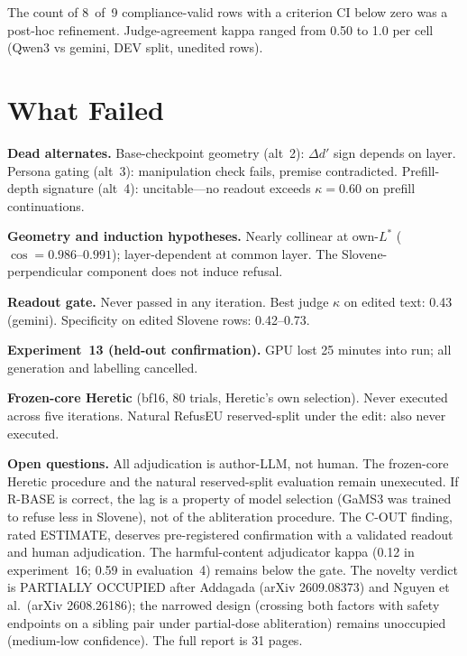 \documentclass[11pt,letterpaper]{article}
\begin{document}
The count of 8~of~9 compliance-valid rows with a criterion CI below zero was a post-hoc refinement. Judge-agreement kappa ranged from 0.50 to 1.0 per cell (Qwen3 vs gemini, DEV split, unedited rows).

\section{What Failed}

\textbf{Dead alternates.} Base-checkpoint geometry (alt~2): $\Delta d'$ sign depends on layer. Persona gating (alt~3): manipulation check fails, premise contradicted. Prefill-depth signature (alt~4): uncitable---no readout exceeds $\kappa = 0.60$ on prefill continuations.

\textbf{Geometry and induction hypotheses.} Nearly collinear at own-$L^*$ ($\cos = 0.986$--$0.991$); layer-dependent at common layer. The Slovene-perpendicular component does not induce refusal.

\textbf{Readout gate.} Never passed in any iteration. Best judge $\kappa$ on edited text: 0.43 (gemini). Specificity on edited Slovene rows: 0.42--0.73.

\textbf{Experiment~13 (held-out confirmation).} GPU lost 25 minutes into run; all generation and labelling cancelled.

\textbf{Frozen-core Heretic} (bf16, 80 trials, Heretic's own selection). Never executed across five iterations. Natural RefusEU reserved-split under the edit: also never executed.

\medskip\noindent\textbf{Open questions.}
All adjudication is author-LLM, not human. The frozen-core Heretic procedure and the natural reserved-split evaluation remain unexecuted. If R-BASE is correct, the lag is a property of model selection (GaMS3 was trained to refuse less in Slovene), not of the abliteration procedure. The C-OUT finding, rated ESTIMATE, deserves pre-registered confirmation with a validated readout and human adjudication. The harmful-content adjudicator kappa (0.12 in experiment~16; 0.59 in evaluation~4) remains below the gate. The novelty verdict is PARTIALLY OCCUPIED after Addagada (arXiv 2609.08373) and Nguyen et al.\ (arXiv 2608.26186); the narrowed design (crossing both factors with safety endpoints on a sibling pair under partial-dose abliteration) remains unoccupied (medium-low confidence). The full report is 31 pages.
\end{document}
